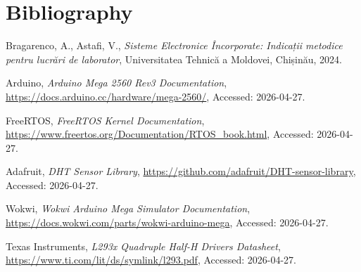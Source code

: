 \section{Bibliography}

\begin{enumerate}[label={[\arabic*]}]
    \item Bragarenco, A., Astafi, V., \textit{Sisteme Electronice Încorporate: Indicații metodice pentru lucrări de laborator}, Universitatea Tehnică a Moldovei, Chișinău, 2024.
    \item Arduino, \textit{Arduino Mega 2560 Rev3 Documentation}, \url{https://docs.arduino.cc/hardware/mega-2560/}, Accessed: 2026-04-27.
    \item FreeRTOS, \textit{FreeRTOS Kernel Documentation}, \url{https://www.freertos.org/Documentation/RTOS_book.html}, Accessed: 2026-04-27.
    \item Adafruit, \textit{DHT Sensor Library}, \url{https://github.com/adafruit/DHT-sensor-library}, Accessed: 2026-04-27.
    \item Wokwi, \textit{Wokwi Arduino Mega Simulator Documentation}, \url{https://docs.wokwi.com/parts/wokwi-arduino-mega}, Accessed: 2026-04-27.
    \item Texas Instruments, \textit{L293x Quadruple Half-H Drivers Datasheet}, \url{https://www.ti.com/lit/ds/symlink/l293.pdf}, Accessed: 2026-04-27.
\end{enumerate}
